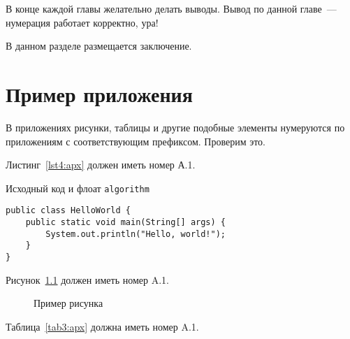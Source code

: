 \documentclass[annotation,times,page4]{itmo-student-thesis}
\begin{document}
\chapterconclusion

В конце каждой главы желательно делать выводы. Вывод по данной главе~--- нумерация работает корректно, ура!

\startconclusionpage

В данном разделе размещается заключение.

\printbibliography[heading=trueHeading]

\appendix

\chapter{Пример приложения}

В приложениях рисунки, таблицы и другие подобные элементы нумеруются по приложениям с соответствующим префиксом. Проверим это.

Листинг~\ref{lst4:apx} должен иметь номер А.1.

\begin{algorithm}[!h]
\caption{Исходный код и флоат \texttt{algorithm}}\label{lst4:apx}
\begin{lstlisting}
public class HelloWorld {
	public static void main(String[] args) {
		System.out.println("Hello, world!");
	}
}
\end{lstlisting}
\end{algorithm}

Рисунок~\ref{fig2:apx} должен иметь номер A.1.

\begin{figure}[!h]
\caption{Пример рисунка}\label{fig2:apx}
\centering
{}
\end{figure}

Таблица~\ref{tab3:apx} должна иметь номер A.1.
\end{document}

